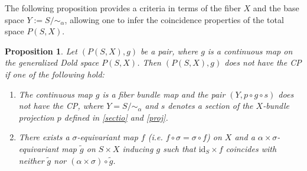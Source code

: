 \documentclass{amsart}
\newtheorem{proposition}[theorem]{Proposition}
\newcommand{\subsecref}[1]{Subsection~\ref{#1}}
\begin{document}
	
	 The following proposition provides a criteria in terms of the fiber $X$ and the base space $Y := S/\!\!\sim_\alpha$, allowing one to infer the coincidence properties of the total space $P(S,X)$.
	
	
	
	\begin{proposition}\label{necessary condition}
		Let $(P(S,X),g)$ be a pair, where $g$ is a continuous map on the generalized Dold space $P(S,X)$. Then $(P(S,X),g)$ does not have the CP if one of the following hold:
		\begin{enumerate}
			\item The continuous map $g$ is a fiber bundle map and the pair $(Y,p \circ g \circ s)$ does not have the CP, 
			where $Y = S/\!\!\sim_\alpha$ and $s$ denotes a section of the $X$-bundle projection $p$ defined in \eqref{sectio} and \eqref{proj}.
			
			\item  
			There exists a $\sigma$-equivariant map $f$ (i.e. $f\circ\sigma =\sigma\circ f$) on $X$ and a $\alpha \times \sigma$-equivariant map $\tilde g$ on $S\times X$ inducing $g$ such that
			$\mathrm{id}_S \times f$ coincides with neither $\tilde{g}$ nor
			$(\alpha \times \sigma) \circ \tilde{g}$.
		\end{enumerate}
		
		
		
	\end{proposition}
\end{document}

